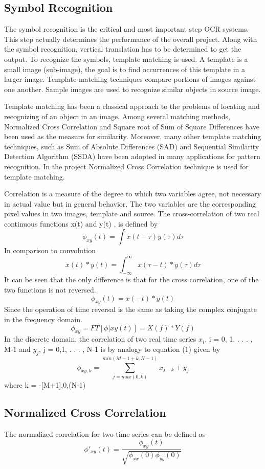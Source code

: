 \documentclass[journal]{IEEEtran}
\begin{document}
\subsection{Symbol Recognition}
The symbol recognition is the critical and most important step OCR systems. This step actually determines the performance of the overall project. Along with the symbol recognition, vertical translation has to be determined to get the output. To recognize the symbols, template matching is used. A template
is a small image (sub-image), the goal is to find occurrences of this template in a larger image. Template matching techniques compare portions of images against one another. Sample images are used to recognize similar objects in source image.\par
Template matching has been a classical approach to the problems of locating and recognizing of an object in an image. Among several matching methods, Normalized Cross Correlation and Square root of Sum of Square Differences have been used as the measure for similarity. Moreover, many other template matching techniques, such as Sum of Absolute Differences (SAD) and Sequential Similarity Detection Algorithm (SSDA) have been adopted in many applications for pattern recognition. In the project Normalized Cross Correlation technique is used for template matching. \par
Correlation is a measure of the degree to which two variables agree, not necessary in actual value but in general behavior. The two variables are the corresponding pixel values in two images, template and source. The cross-correlation of two real continuous functions x(t) and y(t) , is defined by
\[ \phi _{xy} (t) = \int x(t - \tau  )y(\tau)d \tau \]
In comparison to convolution
\[ x(t)*y(t) = \int _{- \infty }^{ \infty } x( \tau - t)*y(\tau)d \tau \]
It can be seen that the only difference is that for the cross correlation, one of the two functions is not reversed.
\[ \phi _{xy} (t) = x(-t)*y(t) \]
Since the operation of time reversal is the same as taking the complex conjugate in the frequency domain.
\[ \phi_{xy} = FT[\phi|xy(t)] = X(f)*Y(f) \]
In the discrete domain, the correlation of two real time series $x_i$, i = 0, 1, . . . , M-1 and $y_j$, j = 0,1, . . . , N-1 is by analogy to equation (1) given by
\[ \phi _{xy, k} = \sum_{j = max(0,k)}^{min(M-1+k, N-1)} x_{j-k} + y_{j} \]
where k = -[M+1],0,(N-1)

\subsection{Normalized Cross Correlation}
The normalized correlation for two time series can be defined as
\[ \phi' _{xy}(t) = \frac{ \phi _{xy}(t) }{ \sqrt{ \phi _{xx}(0)\phi _{yy}(0) } } \]
\end{document}
